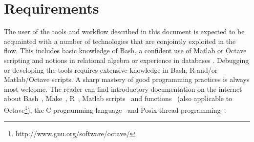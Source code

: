 \section{Requirements}
The user of the tools and workflow described in this document is expected to be acquainted with a number of technologies that are conjointly exploited in the flow. This includes basic knowledge of Bash, a confident use of Matlab or Octave scripting and notions in relational algebra or experience in databases
. Debugging or developing the tools requires extensive knowledge in Bash, R and/or Matlab/Octave scripts. A sharp mastery of good programming practices is always most welcome. The reader can find introductory documentation on the internet about Bash~\cite{mikeg00,garrels08}, Make~\cite{anonymous_make_1,gnu_make}, R~\cite{r,rdebuts,ggplot2,ggplot2_examples}, Matlab scripts~\cite{huber97} and functions~\cite{recktenw95} (also applicable to Octave\footnote{http://www.gnu.org/software/octave/}), the C programming language~\cite{cprogramming} and Posix thread programming~\cite{tim10,barney12}.

